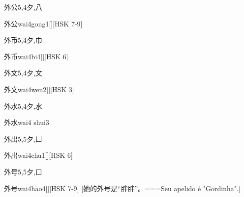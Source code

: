 \begin{Entry}{外公}{5,4}{⼣,⼋}
  \begin{Phonetics}{外公}{wai4gong1}[][HSK 7-9]
  \end{Phonetics}
\end{Entry}

\begin{Entry}{外币}{5,4}{⼣,⼱}
  \begin{Phonetics}{外币}{wai4bi4}[][HSK 6]
  \end{Phonetics}
\end{Entry}

\begin{Entry}{外文}{5,4}{⼣,⽂}
  \begin{Phonetics}{外文}{wai4wen2}[][HSK 3]
  \end{Phonetics}
\end{Entry}

\begin{Entry}{外水}{5,4}{⼣,⽔}
  \begin{Phonetics}{外水}{wai4 shui3}
  \end{Phonetics}
\end{Entry}

\begin{Entry}{外出}{5,5}{⼣,⼐}
  \begin{Phonetics}{外出}{wai4chu1}[][HSK 6]
  \end{Phonetics}
\end{Entry}

\begin{Entry}{外号}{5,5}{⼣,⼝}
  \begin{Phonetics}{外号}{wai4hao4}[][HSK 7-9]
    [她的外号是“胖胖”。===Seu apelido é "Gordinha".]
  \end{Phonetics}
\end{Entry}

